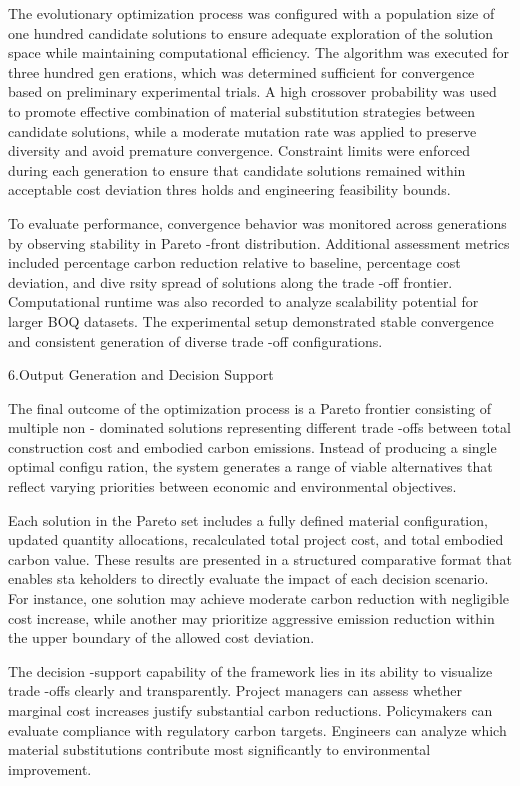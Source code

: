 \documentclass[10pt,twocolumn]{article}
\begin{document}
The evolutionary optimization process was configured with a population size of one hundred 
candidate solutions to ensure adequate exploration of the solution space while maintaining 
computational efficiency. The algorithm was executed for three hundred gen erations, which was 
determined sufficient for convergence based on preliminary experimental trials. A high crossover 
probability was used to promote effective combination of material substitution strategies between 
candidate solutions, while a moderate mutation rate was applied to preserve diversity and avoid 
premature convergence. Constraint limits were enforced during each generation to ensure that 
candidate solutions remained within acceptable cost deviation thres holds and engineering feasibility 
bounds.  
 
To evaluate performance, convergence behavior was monitored across generations by observing 
stability in Pareto -front distribution. Additional assessment metrics included percentage carbon 
reduction relative to baseline, percentage cost deviation, and dive rsity spread of solutions along the 
trade -off frontier. Computational runtime was also recorded to analyze scalability potential for larger 
BOQ datasets. The experimental setup demonstrated stable convergence and consistent generation 
of diverse trade -off configurations.  
 
6.Output Generation and Decision Support  
 
The final outcome of the optimization process is a Pareto frontier consisting of multiple non -
dominated solutions representing different trade -offs between total construction cost and embodied 
carbon emissions. Instead of producing a single optimal configu ration, the system generates a range 
of viable alternatives that reflect varying priorities between economic and environmental objectives.  
 
Each solution in the Pareto set includes a fully defined material configuration, updated quantity 
allocations, recalculated total project cost, and total embodied carbon value. These results are 
presented in a structured comparative format that enables sta keholders to directly evaluate the 
impact of each decision scenario. For instance, one solution may achieve moderate carbon reduction 
with negligible cost increase, while another may prioritize aggressive emission reduction within the 
upper boundary of the  allowed cost deviation.  
 
The decision -support capability of the framework lies in its ability to visualize trade -offs clearly and 
transparently. Project managers can assess whether marginal cost increases justify substantial carbon 
reductions. Policymakers can evaluate compliance with regulatory carbon targets. Engineers can 
analyze which material substitutions contribute most significantly to environmental improvement.  
 
\end{document}
